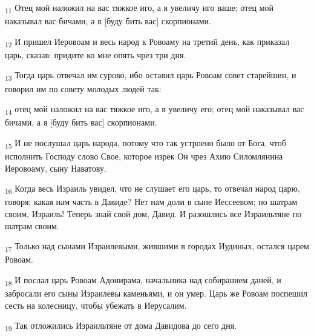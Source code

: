 \begin{tcolorbox}
\textsubscript{11} Отец мой наложил на вас тяжкое иго, а я увеличу иго ваше; отец мой наказывал вас бичами, а я [буду бить вас] скорпионами.
\end{tcolorbox}
\begin{tcolorbox}
\textsubscript{12} И пришел Иеровоам и весь народ к Ровоаму на третий день, как приказал царь, сказав: придите ко мне опять чрез три дня.
\end{tcolorbox}
\begin{tcolorbox}
\textsubscript{13} Тогда царь отвечал им сурово, ибо оставил царь Ровоам совет старейшин, и говорил им по совету молодых людей так:
\end{tcolorbox}
\begin{tcolorbox}
\textsubscript{14} отец мой наложил на вас тяжкое иго, а я увеличу его; отец мой наказывал вас бичами, а я [буду бить вас] скорпионами.
\end{tcolorbox}
\begin{tcolorbox}
\textsubscript{15} И не послушал царь народа, потому что так устроено было от Бога, чтоб исполнить Господу слово Свое, которое изрек Он чрез Ахию Силомлянина Иеровоаму, сыну Наватову.
\end{tcolorbox}
\begin{tcolorbox}
\textsubscript{16} Когда весь Израиль увидел, что не слушает его царь, то отвечал народ царю, говоря: какая нам часть в Давиде? Нет нам доли в сыне Иессеевом; по шатрам своим, Израиль! Теперь знай свой дом, Давид. И разошлись все Израильтяне по шатрам своим.
\end{tcolorbox}
\begin{tcolorbox}
\textsubscript{17} Только над сынами Израилевыми, жившими в городах Иудиных, остался царем Ровоам.
\end{tcolorbox}
\begin{tcolorbox}
\textsubscript{18} И послал царь Ровоам Адонирама, начальника над собиранием даней, и забросали его сыны Израилевы каменьями, и он умер. Царь же Ровоам поспешил сесть на колесницу, чтобы убежать в Иерусалим.
\end{tcolorbox}
\begin{tcolorbox}
\textsubscript{19} Так отложились Израильтяне от дома Давидова до сего дня.
\end{tcolorbox}
